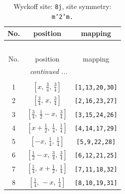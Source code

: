 \documentclass[fleqn,8pt]{jsarticle}
\begin{document}
\begin{longtable}{ccc}
\caption{Wyckoff site: {\tt 8j}, site symmetry: {\tt m'2'm.}}
 \\
 \hline \hline
No. & position & mapping \\ \hline \endfirsthead

\multicolumn{2}{l}{\tablename\ \thetable{}} \\
 \hline \hline
No. & position & mapping \\ \hline \endhead

 \hline \hline
\multicolumn{2}{r}{\footnotesize\it continued ...} \\ \endfoot

 \hline \hline
\multicolumn{2}{r}{} \\ \endlastfoot

1 & $\left[ x,\, \frac{3}{4},\, \frac{3}{4} \right]$ & {\tt [1,13,20,30]} \\ \hline
2 & $\left[ \frac{3}{4},\, x,\, \frac{3}{4} \right]$ & {\tt [2,16,23,27]} \\ \hline
3 & $\left[ \frac{3}{4},\, \frac{1}{2} - x,\, \frac{3}{4} \right]$ & {\tt [3,15,24,26]} \\ \hline
4 & $\left[ x + \frac{1}{2},\, \frac{1}{4},\, \frac{1}{4} \right]$ & {\tt [4,14,17,29]} \\ \hline
5 & $\left[ - x,\, \frac{1}{4},\, \frac{1}{4} \right]$ & {\tt [5,9,22,28]} \\ \hline
6 & $\left[ \frac{1}{2} - x,\, \frac{3}{4},\, \frac{3}{4} \right]$ & {\tt [6,12,21,25]} \\ \hline
7 & $\left[ \frac{1}{4},\, x + \frac{1}{2},\, \frac{1}{4} \right]$ & {\tt [7,11,18,32]} \\ \hline
8 & $\left[ \frac{1}{4},\, - x,\, \frac{1}{4} \right]$ & {\tt [8,10,19,31]} \\
\end{longtable}
\renewcommand{\arraystretch}{1.2}
\end{document}
